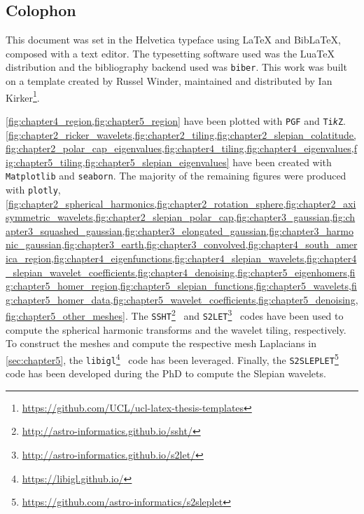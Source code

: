 \begin{appendices}

	\chapter{Colophon}\label{sec:appendix}

	This document was set in the Helvetica typeface using \LaTeX{} and Bib\LaTeX{}, composed with a text editor.
	The typesetting software used was the Lua\TeX{} distribution and the bibliography backend used was \texttt{biber}.
	This work was built on a template created by Russel Winder, maintained and distributed by Ian Kirker\footnote{\url{https://github.com/UCL/ucl-latex-thesis-templates}}.

	\cref{fig:chapter4_region,fig:chapter5_region} have been plotted with \texttt{PGF} and \texttt{Ti\emph{k}Z}.
	\cref{fig:chapter2_ricker_wavelets,fig:chapter2_tiling,fig:chapter2_slepian_colatitude,fig:chapter2_polar_cap_eigenvalues,fig:chapter4_tiling,fig:chapter4_eigenvalues,fig:chapter5_tiling,fig:chapter5_slepian_eigenvalues} have been created with \texttt{Matplotlib} and \texttt{seaborn}.
	The majority of the remaining figures were produced with \texttt{plotly}, \ie{} \cref{fig:chapter2_spherical_harmonics,fig:chapter2_rotation_sphere,fig:chapter2_axisymmetric_wavelets,fig:chapter2_slepian_polar_cap,fig:chapter3_gaussian,fig:chapter3_squashed_gaussian,fig:chapter3_elongated_gaussian,fig:chapter3_harmonic_gaussian,fig:chapter3_earth,fig:chapter3_convolved,fig:chapter4_south_america_region,fig:chapter4_eigenfunctions,fig:chapter4_slepian_wavelets,fig:chapter4_slepian_wavelet_coefficients,fig:chapter4_denoising,fig:chapter5_eigenhomers,fig:chapter5_homer_region,fig:chapter5_slepian_functions,fig:chapter5_wavelets,fig:chapter5_homer_data,fig:chapter5_wavelet_coefficients,fig:chapter5_denoising,fig:chapter5_other_meshes}.
	The \texttt{SSHT}\footnote{\url{http://astro-informatics.github.io/ssht/}}~\cite{McEwen2011} and \texttt{S2LET}\footnote{\url{http://astro-informatics.github.io/s2let/}}~\cite{Leistedt2013} codes have been used to compute the spherical harmonic transforms and the wavelet tiling, respectively.
	To construct the meshes and compute the respective mesh Laplacians in \cref{sec:chapter5}, the \texttt{libigl}\footnote{\url{https://libigl.github.io/}}~\cite{Libigl2017} code has been leveraged.
	Finally, the \texttt{S2SLEPLET}\footnote{\url{https://github.com/astro-informatics/s2sleplet}} code has been developed during the PhD to compute the Slepian wavelets.



\end{appendices}
